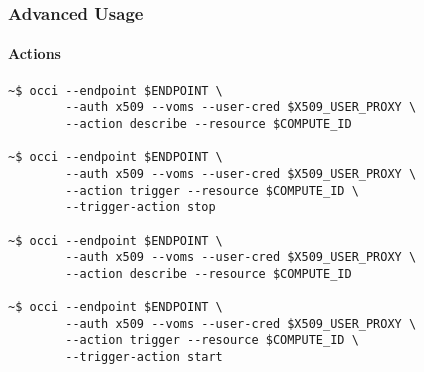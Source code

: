 \begin{frame}[fragile]
  \frametitle{Advanced Usage}
  \framesubtitle{Actions}

  \Fontsmaller
  \begin{Sbox}
  \begin{minipage}{\linewidth-2\fboxsep-2\fboxrule-4pt}
  \color{white}
  \begin{verbatim}
~$ occi --endpoint $ENDPOINT \
        --auth x509 --voms --user-cred $X509_USER_PROXY \
        --action describe --resource $COMPUTE_ID

~$ occi --endpoint $ENDPOINT \
        --auth x509 --voms --user-cred $X509_USER_PROXY \
        --action trigger --resource $COMPUTE_ID \
        --trigger-action stop

~$ occi --endpoint $ENDPOINT \
        --auth x509 --voms --user-cred $X509_USER_PROXY \
        --action describe --resource $COMPUTE_ID

~$ occi --endpoint $ENDPOINT \
        --auth x509 --voms --user-cred $X509_USER_PROXY \
        --action trigger --resource $COMPUTE_ID \
        --trigger-action start
  \end{verbatim}
  \end{minipage}
  \end{Sbox}
  \fcolorbox{black}{black}{\TheSbox}
\end{frame}
